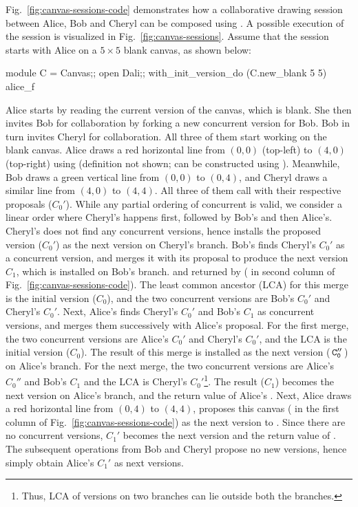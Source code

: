 Fig.~\ref{fig:canvas-sessions-code} demonstrates how a collaborative
drawing session between Alice, Bob and Cheryl can be composed using
\name. A possible execution of the session is visualized in
Fig.~\ref{fig:canvas-sessions}. Assume that the session starts with
Alice on a $5\times 5$ blank canvas, as shown below:
\begin{ocaml}
  module C = Canvas;; open Dali;;
  with_init_version_do (C.new_blank 5 5) alice_f 
\end{ocaml}
Alice starts by reading the current version of the canvas, which is
blank. She then invites Bob for collaboration by forking a new
concurrent version for Bob. Bob in turn invites Cheryl for
collaboration. All three of them start working on the blank canvas.
Alice draws a red horizontal line from $(0,0)$ (top-left) to $(4,0)$
(top-right) using  (definition not shown; can be
constructed using ). Meanwhile, Bob draws a green vertical
line from $(0,0)$ to $(0,4)$, and Cheryl draws a similar line from
$(4,0)$ to $(4,4)$. All three of them call  with their
respective proposals ($C_0'$). While any partial ordering of
concurrent  is valid, we consider a linear order where
Cheryl's  happens first, followed by Bob's and then Alice's.
Cheryl's  does not find any concurrent versions, hence
installs the proposed version ($C_0'$) as the next version on Cheryl's
branch. Bob's  finds Cheryl's $C_0'$ as a concurrent version,
and merges it with its proposal to produce the next version $C_1$,
which is installed on Bob's branch.  and returned by  (
in second column of Fig.~\ref{fig:canvas-sessions-code}). The least common
ancestor (LCA) for this merge is the initial version ($C_0$), and the two
concurrent versions are Bob's $C_0'$ and Cheryl's $C_0'$. Next,
Alice's  finds Cheryl's $C_0'$ and Bob's $C_1$ as concurrent
versions, and merges them successively with Alice's proposal. For the
first merge, the two concurrent versions are Alice's $C_0'$ and
Cheryl's $C_0'$, and the LCA is the initial version
($C_0$). The result of this merge is installed as the next version
($\,{\tt C_0''}\,$) on Alice's branch. For the next merge, the two
concurrent versions are Alice's $C_0''$ and Bob's $C_1$ and the LCA is
Cheryl's $C_0'$\footnote{Thus, LCA of versions on two branches can lie
outside both the branches.}. The result ($C_1$) becomes the next
version on Alice's branch, and the return value of Alice's .
Next, Alice draws a red horizontal line from $(0,4)$ to $(4,4)$,
proposes this canvas ( in the first column of
Fig.~\ref{fig:canvas-sessions-code}) as the next version to .
Since there are no concurrent versions, $C_1'$ becomes the next
version and the return value of . The subsequent 
operations from Bob and Cheryl propose no new versions, hence simply
obtain Alice's $C_1'$ as next versions.


